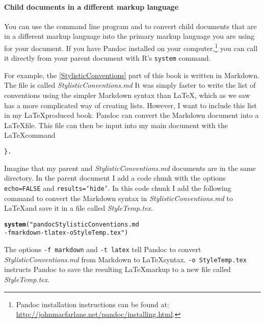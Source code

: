\documentclass[ChapterTOCs,krantz1]{krantz}\usepackage{graphicx, color}
\makeatletter
\newcommand{\hlfunctioncall}[1]{\textcolor[rgb]{0.501960784313725,0,0.329411764705882}{\textbf{#1}}}%
\newenvironment{kframe}{%
 \def\at@end@of@kframe{}%
 \ifinner\ifhmode%
  \def\at@end@of@kframe{\end{minipage}}%
  \begin{minipage}{\columnwidth}%
 \fi\fi%
 \def\FrameCommand##1{\hskip\@totalleftmargin \hskip-\fboxsep
 \colorbox{shadecolor}{##1}\hskip-\fboxsep
     \hskip-\linewidth \hskip-\@totalleftmargin \hskip\columnwidth}%
 \MakeFramed {\advance\hsize-\width
   \@totalleftmargin\z@ \linewidth\hsize
   \@setminipage}}%
 {\par\unskip\endMakeFramed%
 \at@end@of@kframe}
\newenvironment{knitrout}{}{} %
\makeatother
\begin{document}
\paragraph{Child documents in a different markup language}

You can use the  command line program and to convert child documents that are in a different markup language into the primary markup language you are using for your document. If you have Pandoc installed on your computer,\footnote{Pandoc installation instructions can be found at: \url{http://johnmacfarlane.net/pandoc/installing.html}.} you can call it directly from your parent document with R's {\tt{system}} command. 

For example, the \ref{StylisticConventions} part of this book is written in Markdown. The file is called {\emph{StylisticConventions.md}} It was simply faster to write the list of conventions using the simpler Markdown syntax than \LaTeX, which as we saw has a more complicated way of creating lists. However, I want to include this list in my \LaTeX produced book. Pandoc can convert the Markdown document into a \LaTeX file. This file can then be input into my main document with the \LaTeX command {\tt{\}}.

Imagine that my parent and {\emph{StylisticConventions.md}} documents are in the same directory. In the parent document I add a code chunk with the options {\tt{echo=FALSE}} and {\tt{results=`hide'}}. In this code chunk I add the following command to convert the Markdown syntax in {\emph{StylisticConventions.md}} to \LaTeX and save it in a file called {\emph{StyleTemp.tex}}.

\begin{knitrout}
\color{fgcolor}\begin{kframe}
\begin{alltt}
\hlfunctioncall{system}("pandoc StylisticConventions.md
        -f markdown -t latex -o StyleTemp.tex")
\end{alltt}
\end{kframe}
\end{knitrout}


\noindent The options {\tt{-f markdown}} and {\tt{-t latex}} tell Pandoc to convert {\emph{StylisticConventions.md}} from Markdown to \LaTeX syntax. {\tt{-o StyleTemp.tex}} instructs Pandoc to save the resulting \LaTeX markup to a new file called {\emph{StyleTemp.tex}}. 
\end{document}
